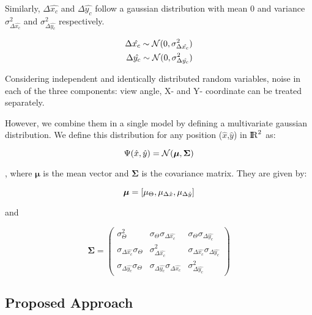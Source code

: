 Similarly, $\Delta \hat{x_c}$ and $\Delta \hat{y_c}$ follow a gaussian distribution with mean $0$ and variance $\sigma_{\Delta \hat{x_c}}^2$ and $\sigma_{\Delta \hat{y_c}}^2$ respectively. 

\begin{equation}
\centering
\begin{aligned}
\Delta \hat{x_c} \sim \mathcal{N}(0, \sigma_{\Delta \hat{x_c}}^2)\\
\Delta \hat{y_c} \sim \mathcal{N}(0, \sigma_{\Delta \hat{y_c}}^2)
\end{aligned}
\end{equation}

Considering independent and identically distributed random variables, noise in each of the three components: view angle, X- and Y- coordinate can be treated separately.

However, we combine them in a single model by defining a multivariate gaussian distribution. We define this distribution for any position ($\hat{x}$,$\hat{y}$) in ${\rm I\!R}^{2}$ as:

\begin{equation}
\centering
\Psi(\hat{x},\hat{y}) = \mathcal{N}(\boldsymbol{\mu},\mathbf{\Sigma})
\end{equation}

, where $\boldsymbol{\mu}$ is the mean vector and $\mathbf{\Sigma}$ is the covariance matrix. They are given by:

\begin{equation}
\centering
\boldsymbol{\mu}=[\mu_\Theta, \mu_{\Delta \hat{x}}, \mu_{\Delta \hat{y}}]
\label{eq:mean-vector}
\end{equation}

and 

\begin{equation}
\mathbf{\Sigma} = 
\begin{pmatrix} 
\sigma_\Theta^2 & \sigma_\Theta \sigma_{\Delta \hat{x_c}} & \sigma_\Theta \sigma_{\Delta \hat{y_c}}\\ 
\sigma_{\Delta \hat{x_c}} \sigma_\Theta  & \sigma_{\Delta \hat{x_c}}^2 & \sigma_{\Delta \hat{x_c}} \sigma_{\Delta \hat{y_c}}\\
\sigma_{\Delta \hat{y_c}} \sigma_\Theta & \sigma_{\Delta \hat{y_c}} \sigma_{\Delta \hat{x_c}}& \sigma_{\Delta \hat{y_c}}^2
\end{pmatrix}
\end{equation}

\subsection{Proposed Approach}

